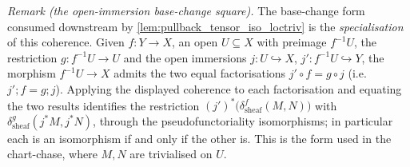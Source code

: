 \begin{lemma}
  \emph{Remark (the open-immersion base-change square).} The base-change form consumed
  downstream by \cref{lem:pullback_tensor_iso_loctriv} is the \emph{specialisation} of
  this coherence. Given \(f : Y \to X\), an open \(U \subseteq X\) with preimage
  \(f^{-1}U\), the restriction \(g : f^{-1}U \to U\) and the open immersions
  \(j : U \hookrightarrow X\), \(j' : f^{-1}U \hookrightarrow Y\), the morphism
  \(f^{-1}U \to X\) admits the two equal factorisations \(j' \circ f = g \circ j\)
  (i.e. \(j' \mathbin{;} f = g \mathbin{;} j\)). Applying the displayed coherence to
  each factorisation and equating the two results identifies the restriction
  \((j')^{*}\bigl(\delta^{f}_{\mathrm{sheaf}}(M,N)\bigr)\) with
  \(\delta^{g}_{\mathrm{sheaf}}(j^{*}M, j^{*}N)\), through the pseudofunctoriality
  isomorphisms; in particular each is an isomorphism if and only if the other is. This
  is the form used in the chart-chase, where \(M, N\) are trivialised on \(U\).
\end{lemma}

